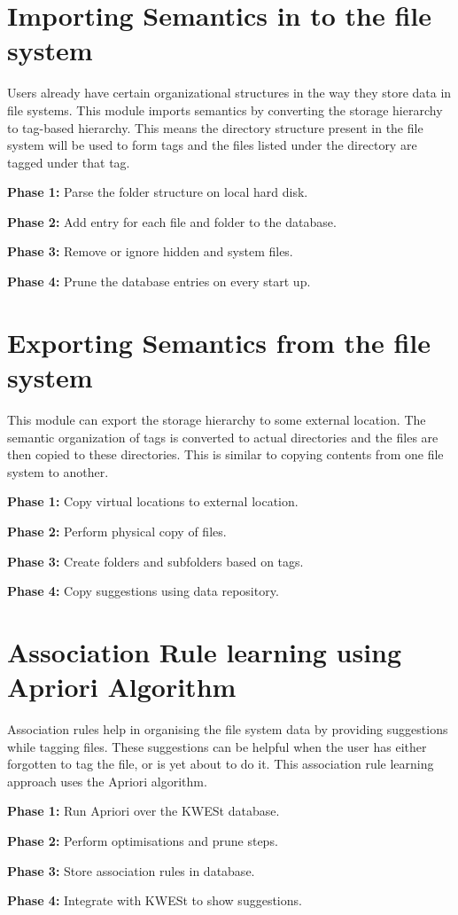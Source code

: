 \section{Importing Semantics in to the file system}
Users already have certain organizational structures in the way they store data in file systems. This module imports semantics by converting the storage hierarchy to tag-based hierarchy. This means the directory structure present in the file system will be used to form tags and the files listed under the directory are tagged under that tag.
\begin{list}{•}{•}
\item \textbf{Phase 1:} Parse the folder structure on local hard disk.
\item \textbf{Phase 2:} Add entry for each file and folder to the database.
\item \textbf{Phase 3:} Remove or ignore hidden and system files.
\item \textbf{Phase 4:} Prune the database entries on every start up.
\end{list}

\section{Exporting Semantics from the file system}
This module can export the storage hierarchy to some external location. The semantic organization of tags is converted to actual directories and the files are then copied to these directories. This is similar to copying contents from one file system to another.
\begin{list}{•}{•}
\item \textbf{Phase 1:} Copy virtual locations to external location.
\item \textbf{Phase 2:} Perform physical copy of files.
\item \textbf{Phase 3:} Create folders and subfolders based on tags.
\item \textbf{Phase 4:} Copy suggestions using data repository.
\end{list}

\section{Association Rule learning using Apriori Algorithm}
Association rules help in organising the file system data by providing suggestions while tagging files. These suggestions can be helpful when the user has either forgotten to tag the file, or is yet about to do it. This association rule learning approach uses the Apriori algorithm.
\begin{list}{•}{•}
\item \textbf{Phase 1:} Run Apriori over the KWESt database.
\item \textbf{Phase 2:} Perform optimisations and prune steps.
\item \textbf{Phase 3:} Store association rules in database.
\item \textbf{Phase 4:} Integrate with KWESt to show suggestions.
\end{list}

